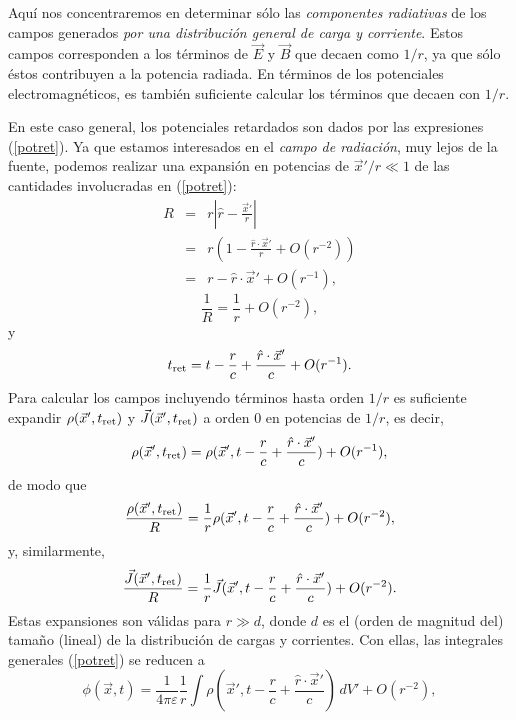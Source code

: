 Aquí nos concentraremos en determinar sólo las \textit{componentes radiativas} de los campos generados \textit{por una distribución general de carga y corriente}. Estos campos corresponden a los términos de $\vec{E}$ y $\vec{B}$ que decaen como $1/r$, ya que sólo éstos contribuyen a la potencia radiada. En términos de los potenciales electromagnéticos, es también suficiente calcular los términos que decaen con $1/r$.

En este caso general, los potenciales retardados son dados por las expresiones (\ref{potret}). Ya que estamos interesados en el \textit{campo de radiación}, muy lejos de la fuente, podemos realizar una expansión en potencias de $\vec{x}'/r\ll 1$ de las cantidades involucradas en (\ref{potret}):
\begin{eqnarray}
 R&=&r\left|\hat{r}-\frac{\vec{x}'}{r}\right| \\
&=&r\left(1-\frac{\hat{r}\cdot\vec{x}'}{r}+O(r^{-2})\right) \\
&=& r-\hat{r}\cdot\vec{x}'+O(r^{-1}),
\end{eqnarray}
\begin{equation}
 \frac{1}{R}=\frac{1}{r}+O(r^{-2}),
\end{equation}
y
\begin{equation}
 t_{\rm ret}=t-\frac{r}{c}+\frac{\hat{r}\cdot\vec{x}'}{c}+O(r^{-1}).
\end{equation}
Para calcular los campos incluyendo términos hasta orden $1/r$ es suficiente expandir $\rho(\vec{x}',t_{\rm ret})$ y $\vec{J}(\vec{x}',t_{\rm ret})$ a orden 0 en potencias de $1/r$, es decir,
\begin{equation}
 \rho(\vec{x}',t_{\rm ret})=\rho(\vec{x}',t-\frac{r}{c}+\frac{\hat{r}\cdot\vec{x}'}{c})+O(r^{-1}),
\end{equation}
de modo que
\begin{equation}
 \frac{\rho(\vec{x}',t_{\rm ret})}{R}=\frac{1}{r}\rho(\vec{x}',t-\frac{r}{c}+\frac{\hat{r}\cdot\vec{x}'}{c})+O(r^{-2}),
\end{equation}
y, similarmente,
\begin{equation}
 \frac{\vec{J}(\vec{x}',t_{\rm ret})}{R}=\frac{1}{r}\vec{J}(\vec{x}',t-\frac{r}{c}+\frac{\hat{r}\cdot\vec{x}'}{c})+O(r^{-2}).
\end{equation}
Estas expansiones son válidas para $r\gg d$, donde $d$ es el (orden de magnitud del) tamaño (lineal) de la distribución de cargas y corrientes. Con ellas, las integrales generales (\ref{potret}) se reducen a
\begin{equation}
 \phi(\vec{x},t)=\frac{1}{4\pi\varepsilon}\frac{1}{r}\int\rho(\vec{x}',t-\frac{r}{c}+\frac{\hat{r}\cdot\vec{x}'}{c})\,dV'+O(r^{-2}),
\end{equation}
